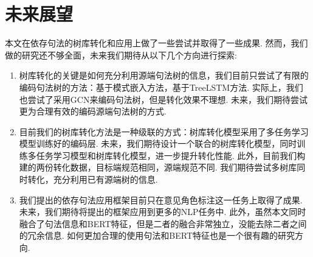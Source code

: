 \section{未来展望}

本文在依存句法的树库转化和应用上做了一些尝试并取得了一些成果. 然而，我们做的研究还不够全面，未来我们期待从以下几个方向进行探索:
\begin{enumerate}
    \item 树库转化的关键是如何充分利用源端句法树的信息，我们目前只尝试了有限的编码句法树的方法：基于模式嵌入方法，基于TreeLSTM方法.
          实际上，我们也尝试了采用GCN来编码句法树，但是转化效果不理想.
          未来，我们期待尝试更为合理有效的编码源端句法树的方式.
    \item 目前我们的树库转化方法是一种级联的方式：树库转化模型采用了多任务学习模型训练好的编码层.
          未来，我们期待设计一个联合的树库转化模型，同时训练多任务学习模型和树库转化模型，进一步提升转化性能.
          此外，目前我们构建的两份转化数据，目标端规范相同，源端规范不同.
          我们期待尝试多树库同时转化，充分利用已有源端树的信息.
    \item 我们提出的依存句法应用框架目前只在意见角色标注这一任务上取得了成果.
          未来，我们期待将提出的框架应用到更多的NLP任务中.
          此外，虽然本文同时融合了句法信息和BERT特征，但是二者的融合非常独立，没能去除二者之间的冗余信息.
          如何更加合理的使用句法和BERT特征也是一个很有趣的研究方向.
\end{enumerate}

%




